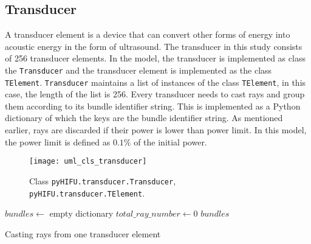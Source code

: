 \subsection{Transducer}
A transducer element is a device that can convert other forms of energy into acoustic energy in the form of ultrasound. The transducer in this study consists of 256 transducer elements. In the model, the transducer is implemented as class the \texttt{Transducer} and the transducer element is implemented as the class \texttt{TElement}. \texttt{Transducer} maintains a list of instances of the class \texttt{TElement}, in this case, the length of the list is 256.
Every transducer needs to cast rays and group them according to its bundle identifier string. This is implemented as a Python dictionary of which the keys are the bundle identifier string. As mentioned earlier, rays are discarded if their power is lower than power limit. In this model, the power limit is defined as $0.1\%$ of the initial power. 

\begin{figure}[h]
    \centering
    \texttt{[image: uml\_cls\_transducer]}
    \caption{Class \texttt{pyHIFU.transducer.Transducer}, \texttt{pyHIFU.transducer.TElement}.}
    \label{fig:uml_cls_transducer}
\end{figure}

\IncMargin{1em}
\begin{algorithm}[H]
    \DontPrintSemicolon
    $bundles \leftarrow$ empty dictionary\;
    $total\_ray\_number \leftarrow 0$\;
    \Return $bundles$
    \caption{Casting rays from one transducer element}\label{algo_disjdecomp}
\end{algorithm}
\DecMargin{1em}

